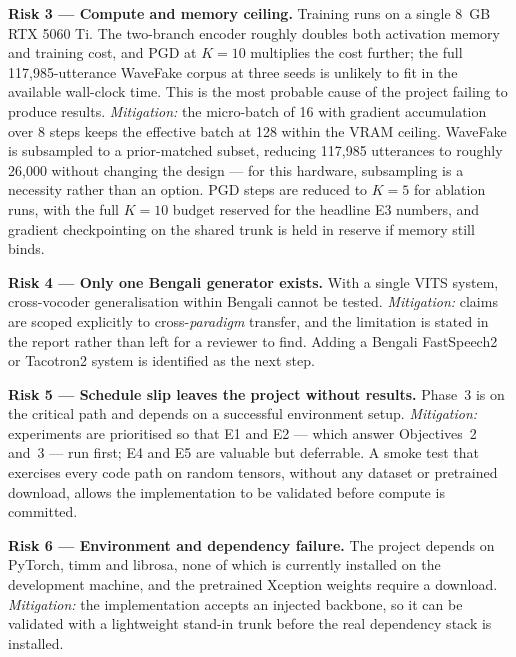 \documentclass[conference]{IEEEtran}
\begin{document}
\textbf{Risk 3 --- Compute and memory ceiling.} Training runs on a single
8~GB RTX 5060 Ti. The two-branch encoder roughly doubles both activation
memory and training cost, and PGD at $K = 10$ multiplies the cost further; the
full 117,985-utterance WaveFake corpus at three seeds is unlikely to fit in
the available wall-clock time. This is the most probable cause of the project
failing to produce results.
\emph{Mitigation:} the micro-batch of 16 with gradient accumulation over 8
steps keeps the effective batch at 128 within the VRAM ceiling. WaveFake is
subsampled to a prior-matched subset, reducing 117,985 utterances to roughly
26,000 without changing the design --- for this hardware, subsampling is a
necessity rather than an option. PGD steps are reduced to $K = 5$ for
ablation runs, with the full $K = 10$ budget reserved for the headline E3
numbers, and gradient checkpointing on the shared trunk is held in reserve if
memory still binds.

\textbf{Risk 4 --- Only one Bengali generator exists.} With a single VITS
system, cross-vocoder generalisation within Bengali cannot be tested.
\emph{Mitigation:} claims are scoped explicitly to cross-\emph{paradigm}
transfer, and the limitation is stated in the report rather than left for a
reviewer to find. Adding a Bengali FastSpeech2 or Tacotron2 system is
identified as the next step.

\textbf{Risk 5 --- Schedule slip leaves the project without results.} Phase~3
is on the critical path and depends on a successful environment setup.
\emph{Mitigation:} experiments are prioritised so that E1 and E2 --- which
answer Objectives~2 and~3 --- run first; E4 and E5 are valuable but
deferrable. A smoke test that exercises every code path on random tensors,
without any dataset or pretrained download, allows the implementation to be
validated before compute is committed.

\textbf{Risk 6 --- Environment and dependency failure.} The project depends on
PyTorch, timm and librosa, none of which is currently installed on the
development machine, and the pretrained Xception weights require a download.
\emph{Mitigation:} the implementation accepts an injected backbone, so it can
be validated with a lightweight stand-in trunk before the real dependency
stack is installed.

\end{document}
